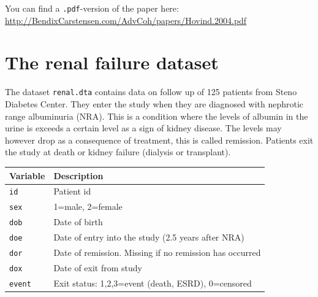 \documentclass[
]{book}
\begin{document}
You can find a \texttt{.pdf}-version of the paper here:
\url{http://BendixCarstensen.com/AdvCoh/papers/Hovind.2004.pdf}

\section{The renal failure dataset}\label{the-renal-failure-dataset}

The dataset \texttt{renal.dta} contains data on follow up of 125
patients from Steno Diabetes Center. They enter the study when they
are diagnosed with nephrotic range albuminuria (NRA). This is a
condition where the levels of albumin in the urine is exceeds a
certain level as a sign of kidney disease. The levels may however drop
as a consequence of treatment, this is called remission. Patients exit
the study at death or kidney failure (dialysis or transplant).

\begin{longtable}[]{@{}ll@{}}
\toprule\noalign{}
Variable & Description \\
\midrule\noalign{}
\endhead
\bottomrule\noalign{}
\endlastfoot
\texttt{id} & Patient id \\
\texttt{sex} & 1=male, 2=female \\
\texttt{dob} & Date of birth \\
\texttt{doe} & Date of entry into the study (2.5 years after NRA) \\
\texttt{dor} & Date of remission. Missing if no remission has occurred \\
\texttt{dox} & Date of exit from study \\
\texttt{event} & Exit status: 1,2,3=event (death, ESRD), 0=censored \\
\end{longtable}
\end{document}
